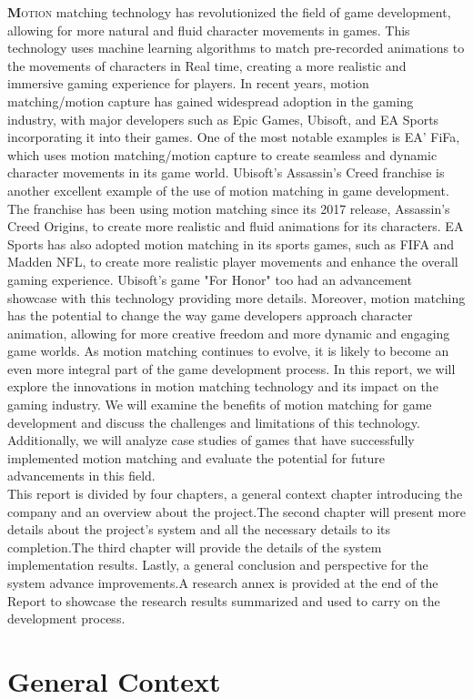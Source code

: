 \documentclass[12pt]{book}
\newenvironment{ConfigureChapter}{
    \centering
        \Centering
        \renewcommand{\thechapter}{\Roman{chapter}}
    }{
    \let\cleardoublepage=\clearpage
    \setcounter{section}{0}
}
\begin{document}
\lettrine[findent=1pt]{\textbf{M}}{otion} matching technology has revolutionized the field of game development, allowing for more natural and fluid character movements in games. This technology uses machine learning algorithms to match pre-recorded animations to the movements of characters in Real time, creating a more realistic and immersive gaming experience for players. In recent years, motion matching/motion capture has gained widespread adoption in the gaming industry, with major developers such as Epic Games, Ubisoft, and EA Sports incorporating it into their games. One of the most notable examples is EA' FiFa, which uses motion matching/motion capture to create seamless and dynamic character movements in its game world\cite{EA}.\; Ubisoft's Assassin's Creed franchise is another excellent example of the use of motion matching in game development. The franchise has been using motion matching since its 2017 release, Assassin's Creed Origins, to create more realistic and fluid animations for its characters\cite{GDC1}. EA Sports has also adopted motion matching in its sports games, such as FIFA and Madden NFL, to create more realistic player movements and enhance the overall gaming experience\cite{EA1}. Ubisoft's game "For Honor" too had an advancement showcase with this technology providing more details\cite{UBI}. 
Moreover, motion matching has the potential to change the way game developers
approach character animation, allowing for more creative freedom and more dynamic and
engaging game worlds. As motion matching continues to evolve, it is likely to become an even
more integral part of the game development process\cite{GDC2}.
In this report, we will explore the innovations in motion matching technology and its
impact on the gaming industry. We will examine the benefits of motion matching for game
development and discuss the challenges and limitations of this technology. Additionally, we
will analyze case studies of games that have successfully implemented motion matching and
evaluate the potential for future advancements in this field.\\
This report is divided by four chapters, a general context chapter introducing the company and an overview about the project.The second chapter will present more details about the project's system and all the necessary details to its completion.The third chapter will provide the details of the system implementation results. Lastly, a general conclusion and perspective for the system advance improvements.A research annex is provided at the end of the Report to showcase the research results summarized and used to carry on the development process. 
\begin{ConfigureChapter}
    \chapter{\textbf{General Context}}
    \mtcaddchapter{}
    \minitoc
\end{ConfigureChapter}
\newpage
\end{document}

